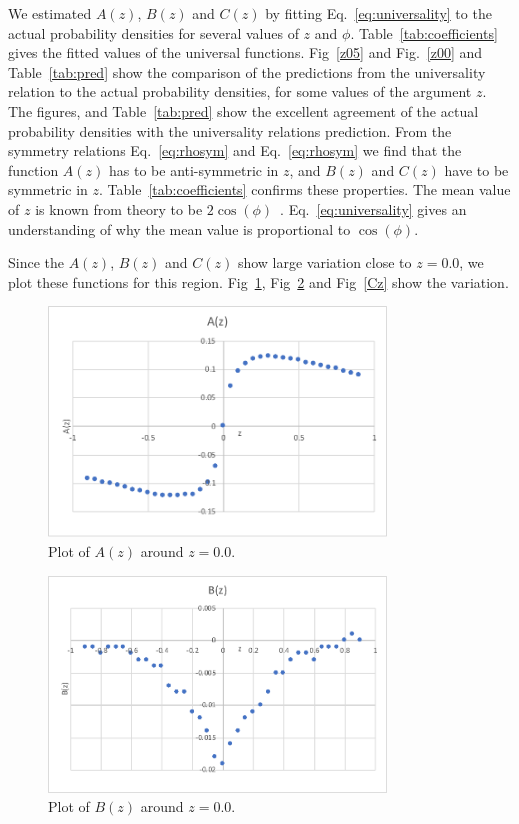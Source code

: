 \documentclass[twoside]{article}
\begin{document}
We estimated $A(z)$, $B(z)$ and $C(z)$ by fitting Eq.~\ref{eq:universality} to the actual
probability densities for several values of $z$ and $\phi$. Table~\ref{tab:coefficients} gives the 
fitted values 
of the universal functions.
Fig~\ref{z05} and Fig.~\ref{z00} and Table~\ref{tab:pred} show the comparison of the predictions 
from the universality 
relation to the actual probability densities, for some values of the argument $z$.
The figures, and 
Table~\ref{tab:pred} show the excellent agreement of the actual probability densities with the
universality relations prediction. 
From the symmetry relations Eq.~\ref{eq:rhosym} and Eq.~\ref{eq:rhosym} we find 
that the function 
$A(z)$ has to be anti-symmetric in $z$, and $B(z)$ and $C(z)$ have to be symmetric in $z$.
Table~\ref{tab:coefficients} confirms these properties. 
The mean value of $z$ is known from theory to be $2\cos(\phi)$~\cite{Shanker 2018b}. 
Eq.~\ref{eq:universality} gives an understanding of why the mean value is proportional to 
$\cos(\phi)$.

Since the $A(z)$, $B(z)$ and $C(z)$ show large variation close to $z=0.0$, we plot
these functions for this region. Fig~\ref{Az}, Fig~\ref{Bz} and Fig~\ref{Cz} 
show the variation.


\begin{figure}
\centering
\includegraphics[width=0.8\textwidth]{Az.pdf}
\caption[]{ 
 Plot of $A(z)$ around $z=0.0$. 
  }
\vspace{1mm}
\label{Az}
\end{figure}

\begin{figure}
\centering
\includegraphics[width=0.8\textwidth]{Bz.pdf}
\caption[]{ 
 Plot of $B(z)$ around $z=0.0$. 
  }
\vspace{1mm}
\label{Bz}
\end{figure}
\end{document}
